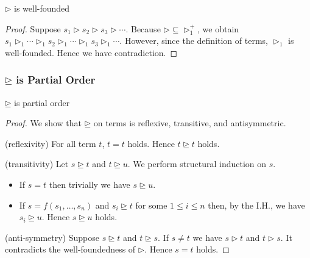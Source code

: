 \documentclass[12pt,aspectratio=169]{beamer}
\begin{document}
\begin{frame}
    \begin{lemma}
        $\rhd$ is well-founded
    \end{lemma}
    \pause
    \begin{proof}
        Suppose $s_1 \rhd s_2 \rhd s_3 \rhd \cdots$.
        \pause
        Because $\rhd \subseteq \rhd_1^+$,
        we obtain $s_1 \rhd_1 \cdots \rhd_1 s_2 \rhd_1 \cdots \rhd_1 s_3 \rhd_1 \cdots$.
        \pause
        However, since the definition of terms, $\rhd_1$ is well-founded.
        \pause
        Hence we have contradiction.
    \end{proof}
\end{frame}

\begin{frame}
    \frametitle{$\unrhd$ is Partial Order}
    \begin{lemma}
        $\unrhd$ is partial order
    \end{lemma}
    \pause
    \begin{proof}
        We show that $\unrhd$ on terms is reflexive, transitive, and antisymmetric.

        \pause
        (reflexivity) For all term $t$, $t = t$ holds. Hence $t \unrhd t$ holds.

        \pause
        (transitivity) Let $s \unrhd t$ and $t \unrhd u$.
        \pause
        We perform structural induction on $s$.
        \begin{itemize}
            \pause
            \item If $s = t$ then trivially we have $s \unrhd u$.
            \pause
            \item If $s = f(s_1, \dots, s_n)$ and $s_i \unrhd t$ for some $1 \leq i \leq n$ then,
            by the I.H., we have $s_i \unrhd u$. Hence $s \unrhd u$ holds.
        \end{itemize}

        \pause
        (anti-symmetry) Suppose $s \unrhd t$ and $t \unrhd s$.
        \pause If $s \neq t$ we have $s \rhd t$ and $t \rhd s$.
        \pause It contradicts the well-foundedness of $\rhd$. Hence $s = t$ holds.
    \end{proof}
\end{frame}
\end{document}
